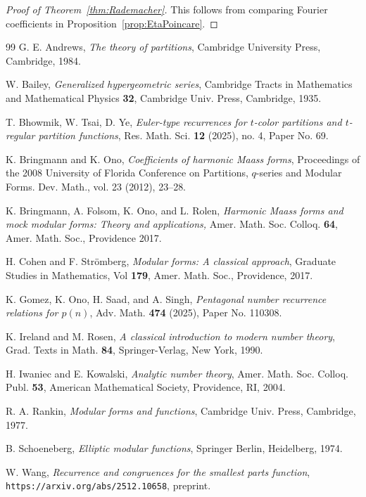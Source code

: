 \documentclass[10pt]{amsart}
\theoremstyle{definition}
\theoremstyle{remark}
\numberwithin{equation}{section}
\begin{document}
	\begin{proof}[Proof of Theorem~\ref{thm:Rademacher}]
	This follows from comparing Fourier coefficients in Proposition~\ref{prop:EtaPoincare}.	
	\end{proof}


	\begin{thebibliography}{99}
		 G. E. Andrews, \emph{The theory of partitions}, Cambridge University Press, Cambridge, 1984.
		
		W. Bailey, {\it Generalized hypergeometric series}, Cambridge Tracts in Mathematics and Mathematical Physics 
		\textbf{32}, Cambridge Univ. Press, Cambridge, 1935.
		
		 T. Bhowmik, W. Tsai, D. Ye, \emph{Euler-type recurrences for $t$-color partitions and $t$-regular partition functions}, Res. Math. Sci. {\bf 12} (2025), no. 4, Paper No. 69.
		
		 K. Bringmann and K. Ono, \emph{Coefficients of harmonic Maass forms}, Proceedings of the 2008 University of Florida Conference on Partitions, $q$-series and Modular Forms. Dev. Math., vol. 23 (2012), 23--28.
		
		 K. Bringmann, A. Folsom, K. Ono, and L. Rolen, \emph{Harmonic Maass forms and mock modular forms: Theory and applications,} Amer. Math. Soc. Colloq. {\bf 64}, Amer. Math. Soc., Providence 2017.
		
		H. Cohen and F. Str\"omberg, \emph{ Modular forms: A classical approach}, Graduate Studies in Mathematics, Vol \textbf{179}, Amer. Math. Soc., Providence, 2017.
		
		 K. Gomez, K. Ono, H. Saad, and A. Singh, \emph{Pentagonal number recurrence relations for $p(n)$}, Adv. Math. {\bf 474} (2025), Paper No. 110308.
		
		 K. Ireland and M. Rosen, \emph{A classical introduction to modern number theory}, Grad. Texts in Math. {\bf 84}, Springer-Verlag, New York, 1990.
		
		 H. Iwaniec and E. Kowalski, \emph{Analytic number theory}, Amer. Math. Soc. Colloq. Publ. {\bf 53}, American Mathematical Society, Providence, RI, 2004.
		
		 R. A. Rankin, \emph{Modular forms and functions}, Cambridge Univ. Press, Cambridge, 1977.
		
		 B. Schoeneberg, \emph{Elliptic modular functions}, Springer Berlin, Heidelberg, 1974.
		
		 W. Wang, \emph{Recurrence and congruences for the smallest parts function}, \texttt{https://arxiv.org/abs/2512.10658}, preprint.

	\end{thebibliography}
	
\end{document}

